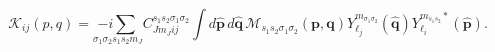 \begin{equation}
\mathcal{K}_{ij}\left( p,q\right) =\underset{\sigma _{1}\sigma
_{2}s_{1}s_{2}m_{J}}{-i\sum }C_{Jm_{J}ij}^{s_{1}s_{2}\sigma _{1}\sigma
_{2}}\int d\hat{\mathbf{p}}\,d\hat{\mathbf{q}}\,\mathcal{M}%
_{s_{1}s_{2}\sigma _{1}\sigma _{2}}\left( \mathbf{p,q}\right) Y_{\ell
_{j}}^{m_{\sigma _{1}\sigma _{2}}}(\hat{\mathbf{q}})Y_{\ell
_{i}}^{m_{s_{1}s_{2}}\ast }(\hat{\mathbf{p}}).
\end{equation}

